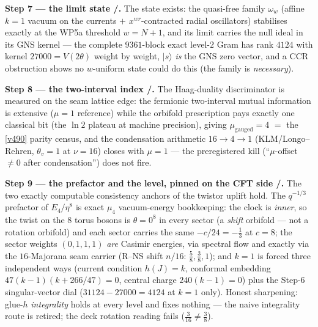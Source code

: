 \documentclass[11pt,a4paper]{article}
\theoremstyle{definition}
\begin{document}
\par\smallskip\noindent\textbf{Step 7 --- the limit state \mE/\mC.} The state exists: the quasi-free
family $\omega_w$ (affine $k{=}1$ vacuum on the currents $+$ $x^{wr}$-contracted radial oscillators)
stabilises exactly at the WP5a threshold $w=N{+}1$, and its limit carries the null ideal in its GNS
kernel --- the complete $9361$-block exact level-$2$ Gram has rank $4124$ with kernel
$27000=V(2\theta)$ weight by weight, $|s\rangle$ \emph{is} the GNS zero vector, and a CCR obstruction
shows no $w$-uniform state could do this (the family is \emph{necessary}).

\par\smallskip\noindent\textbf{Step 8 --- the two-interval index \mE/\mC.} The Haag-duality
discriminator is measured on the seam lattice edge: the fermionic two-interval mutual information is
extensive ($\mu{=}1$ reference) while the orbifold prescription pays exactly one classical bit (the
$\ln2$ plateau at machine precision), giving $\mu_{\mathrm{gauged}}=4$ $=$ the \vref{v490} parity
census, and the condensation arithmetic $16\to4\to1$ (KLM/Longo--Rehren, $\theta_v=1$ at $\nu=16$)
closes with $\mu=1$ --- the preregistered kill (``$\mu$-offset $\neq0$ after condensation'') does not
fire. 

\par\smallskip\noindent\textbf{Step 9 --- the prefactor and the level, pinned on the CFT side
\mE/\mC.} The two exactly computable consistency anchors of the twistor uplift hold. The $q^{-1/3}$
prefactor of $E_4/\eta^8$ is exact $\mu_4$ vacuum-energy bookkeeping: the clock is \emph{inner}, so
the twist on the $8$ torus bosons is $\theta=0^8$ in every sector (a \emph{shift} orbifold --- not a
rotation orbifold) and each sector carries the same $-c/24=-\tfrac13$ at $c=8$; the sector weights
$(0,1,1,1)$ \emph{are} Casimir energies, via spectral flow and exactly via the $16$-Majorana seam
carrier (R--NS shift $n/16$: $\tfrac58,\tfrac38,1$); and $k=1$ is forced three independent ways
(current condition $h(J)=k$, conformal embedding $47(k{-}1)(k{+}266/47)=0$, central charge
$240(k{-}1)=0$) plus the Step-6 singular-vector dial ($31124-27000=4124$ at $k=1$ only). Honest
sharpening: glue-$h$ \emph{integrality} holds at every level and fixes nothing --- the naive
integrality route is retired; the deck rotation reading fails ($\tfrac3{16}\neq\tfrac38$).
\end{document}
